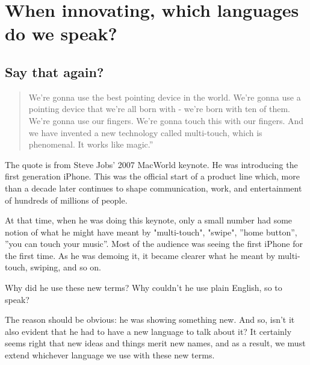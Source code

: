 \chapter{When innovating, which languages do we speak?}
\label{c1}


\section{Say that again?}
\label{c1:s1}
\begin{quote}
We're gonna use the best pointing device in the world. We're gonna use a pointing device that we're all born with - we're born with ten of them. We're gonna use our fingers.
We're gonna touch this with our fingers. And we have invented a new technology called multi-touch, which is phenomenal.
It works like magic.'' \cite{Wright2015a}
\end{quote}

The quote is from Steve Jobs' 2007 MacWorld keynote. He was introducing the first generation iPhone. This was the official start of a product line which, more than a decade later continues to shape communication, work, and entertainment of hundreds of millions of people. 

At that time, when he was doing this keynote, only a small number had some notion of what he might have meant by "multi-touch", "swipe", ''home button'', ''you can touch your music''. Most of the audience was seeing the first iPhone for the first time. As he was demoing it, it became clearer what he meant by multi-touch, swiping, and so on. 

Why did he use these new terms? Why couldn't he use plain English, so to speak? 

The reason should be obvious: he was showing something new. And so, isn't it also evident that he had to have a new language to talk about it? It certainly seems right that new ideas and things merit new names, and as a result, we must extend whichever language we use with these new terms. 

